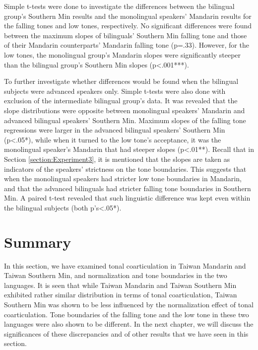 Simple t-tests were done to investigate the differences between the bilingual group's Southern Min results and the monolingual speakers' Mandarin results for the falling tones and low tones, respectively. No significant differences were found between the maximum slopes of bilinguals' Southern Min falling tone and those of their Mandarin counterparts' Mandarin falling tone (p=.33). However, for the low tones, the monolingual group's Mandarin slopes were significantly steeper than the bilingual group's Southern Min slopes (p<.001***).

To further investigate whether differences would be found when the bilingual subjects were advanced speakers only. Simple t-tests were also done with exclusion of the intermediate bilingual group's data. It was revealed that the slope distributions were opposite between monolingual speakers' Mandarin and advanced bilingual speakers' Southern Min. Maximum slopes of the falling tone regressions were larger in the advanced bilingual speakers' Southern Min (p<.05*), while when it turned to the low tone's acceptance, it was the monolingual speaker's Mandarin that had steeper slopes (p<.01**). Recall that in Section \ref{section:Experiment3}, it is mentioned that the slopes are taken as indicators of the speakers' strictness on the tone boundaries. This suggests that when the monolingual speakers had stricter low tone boundaries in Mandarin, and that the advanced bilinguals had stricter falling tone boundaries in Southern Min. A paired t-test revealed that such linguistic difference was kept even within the bilingual subjects (both p's<.05*).

\section{Summary}
In this section, we have examined tonal coarticulation in Taiwan Mandarin and Taiwan Southern Min, and normalization and tone boundaries in the two languages. It is seen that while Taiwan Mandarin and Taiwan Southern Min exhibited rather similar distribution in terms of tonal coarticulation, Taiwan Southern Min was shown to be less influenced by the normalization effect of tonal coarticulation. Tone boundaries of the falling tone and the low tone in these two languages were also shown to be different. In the next chapter, we will discuss the significances of these discrepancies and of other results that we have seen in this section.